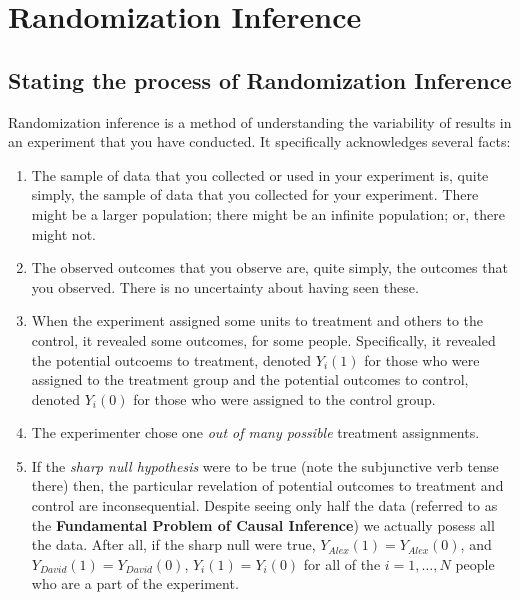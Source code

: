 \documentclass[
]{book}
\providecommand{\tightlist}{%
  \setlength{\itemsep}{0pt}\setlength{\parskip}{0pt}}
\begin{document}
\hypertarget{randomization-inference}{%
\section{Randomization Inference}\label{randomization-inference}}

\hypertarget{stating-the-process-of-randomization-inference}{%
\subsection{Stating the process of Randomization
Inference}\label{stating-the-process-of-randomization-inference}}

Randomization inference is a method of understanding the variability of
results in an experiment that you have conducted. It specifically
acknowledges several facts:

\begin{enumerate}
\def\labelenumi{\arabic{enumi}.}
\tightlist
\item
  The sample of data that you collected or used in your experiment is,
  quite simply, the sample of data that you collected for your
  experiment. There might be a larger population; there might be an
  infinite population; or, there might not.
\item
  The observed outcomes that you observe are, quite simply, the outcomes
  that you observed. There is no uncertainty about having seen these.
\item
  When the experiment assigned some units to treatment and others to the
  control, it revealed some outcomes, for some people. Specifically, it
  revealed the potential outcoems to treatment, denoted \(Y_{i}(1)\) for
  those who were assigned to the treatment group and the potential
  outcomes to control, denoted \(Y_{i}(0)\) for those who were assigned
  to the control group.
\item
  The experimenter chose one \emph{out of many possible} treatment
  assignments.
\item
  If the \emph{sharp null hypothesis} were to be true (note the
  subjunctive verb tense there) then, the particular revelation of
  potential outcomes to treatment and control are inconsequential.
  Despite seeing only half the data (referred to as the
  \textbf{Fundamental Problem of Causal Inference}) we actually posess
  all the data. After all, if the sharp null were true,
  \(Y_{Alex}(1) = Y_{Alex}(0)\), and \(Y_{David}(1) = Y_{David}(0)\),
  \(Y_{i}(1) = Y_{i}(0)\) for all of the \(i = {1, \dots, N}\) people
  who are a part of the experiment.
\end{enumerate}
\end{document}
